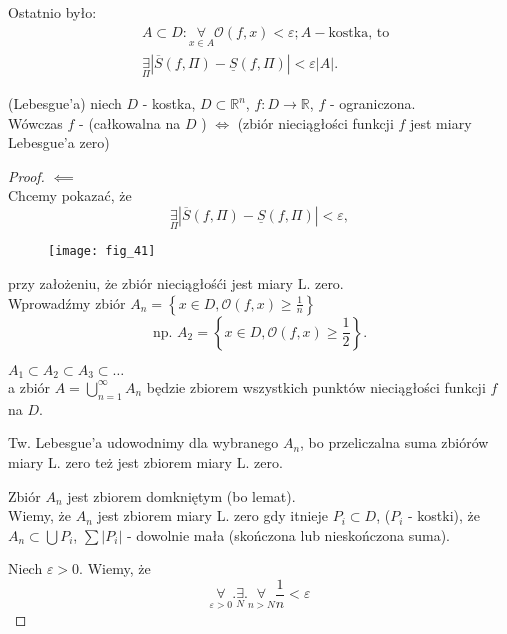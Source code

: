 \documentclass[../main.tex]{subfiles}
\begin{document}
    Ostatnio było:
    \begin{align*}
        &A\subset D : \underset{x\in A}{\forall} \mathcal{O}(f,x)<\varepsilon; A - \text{kostka, to}\\
        &\underset{\Pi}{\exists} | \overline{S}(f,\Pi) - \underline{S}(f,\Pi)| < \varepsilon |A|
    .\end{align*}
    \begin{tw}
        (Lebesgue'a) niech $D$ - kostka, $D\subset \mathbb{R}^n$, $f: D\to \mathbb{R}$, $f$ - ograniczona.\\
        Wówczas $f$ - (całkowalna na $D$ ) $\iff$ (zbiór nieciągłości funkcji $f$ jest miary Lebesgue'a zero)
    \end{tw}
    \begin{proof}
        $\impliedby$ \\
        Chcemy pokazać, że \[
            \underset{\Pi}{\exists} |\overline{S}(f,\Pi) - \underline{S}(f,\Pi) | < \varepsilon
        ,\]
            \begin{figure}[h]
                \centering
                \texttt{[image: fig\_41]}
            \end{figure}
        przy założeniu, że zbiór nieciągłośći jest miary L. zero.\\
        Wprowadźmy zbiór $A_n = \left\{ x\in D, \mathcal{O}(f,x) \ge \frac{1}{n} \right\} $
        \[
            \text{np. } A_2 = \left\{ x\in D, \mathcal{O}(f,x) \ge \frac{1}{2} \right\}
        .\]
        \begin{obserwacja}
            $A_1\subset A_2\subset A_3\subset \ldots$\\
            a zbiór $A = \bigcup_{n=1}^{\infty}A_n$ będzie zbiorem wszystkich punktów nieciągłości funkcji $f$ na  $D$.\\
        \end{obserwacja}
            Tw. Lebesgue'a udowodnimy dla wybranego $A_n$, bo przeliczalna suma zbiórów miary L. zero też jest zbiorem miary L. zero.
        \begin{uwaga}
            Zbiór $A_n$ jest zbiorem domkniętym (bo lemat).\\
            Wiemy, że $A_n$ jest zbiorem miary L. zero gdy itnieje $P_i \subset D$, ($P_i$ - kostki), że $A_n \subset \bigcup P_i $, $\sum |P_i |$ - dowolnie mała (skończona lub nieskończona suma).\\
        \end{uwaga}
        Niech $\varepsilon > 0$. Wiemy, że
        \[
        \underset{\varepsilon>0}{\forall} . \underset{N}{\exists} . \underset{n > N}{\forall} \frac{1}{n} < \varepsilon
\]
\end{proof}
\end{document}
